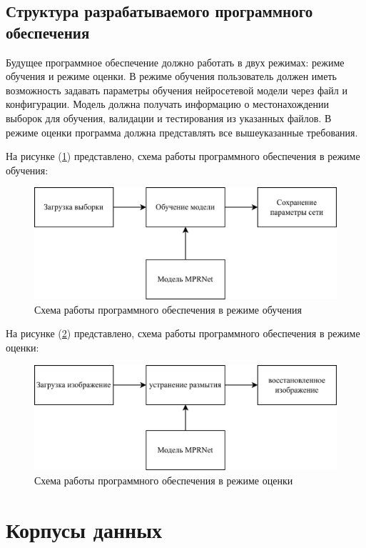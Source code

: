 \subsection{Структура разрабатываемого программного обеспечения}

Будущее программное обеспечение должно работать в двух режимах: режиме обучения и режиме оценки. В режиме обучения пользователь должен иметь возможность задавать параметры обучения нейросетевой модели через файл и конфигурации. Модель должна получать информацию о местонахождении выборок для обучения, валидации и тестирования из указанных файлов. В режиме оценки программа должна представлять все вышеуказанные требования.

На рисунке (\ref{fig:training-model}) представлено, схема работы программного обеспечения в режиме обучения: 
\begin{figure}[H]
	\includegraphics[width=1.0\linewidth]{assets/training-model.png}
	\caption{Схема работы программного обеспечения в режиме обучения}
	\label{fig:training-model}
\end{figure}

На рисунке (\ref{fig:predict-model}) представлено, схема работы программного обеспечения в режиме оценки: 
\begin{figure}[H]
	\centering
	\includegraphics[width=1.0\linewidth]{assets/predict-model.png}
	\caption{Схема работы программного обеспечения в режиме оценки}
	\label{fig:predict-model}
\end{figure}

\section{Корпусы данных}

